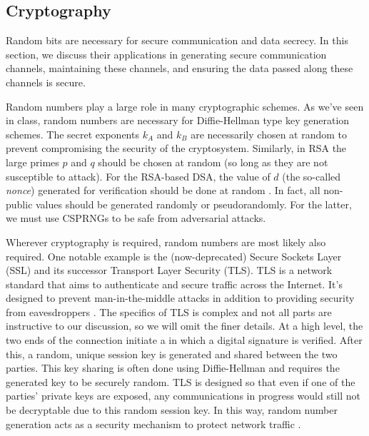\documentclass[titlepage]{article}
\theoremstyle{definition}
\begin{document}
\subsection{Cryptography}
Random bits are necessary for secure communication and data secrecy. In this section, we discuss their applications in generating secure communication channels, maintaining these channels, and ensuring the data passed along these channels is secure.

Random numbers play a large role in many cryptographic schemes. As we've seen in class, random numbers are necessary for Diffie-Hellman type key generation schemes. The secret exponents $k_A$ and $k_B$ are necessarily chosen at random to prevent compromising the security of the cryptosystem. Similarly, in RSA the large primes $p$ and $q$ should be chosen at random (so long as they are not susceptible to attack). For the RSA-based DSA, the value of $d$ (the so-called \textit{nonce}) generated for verification should be done at random \cite{Textbook}. In fact, all non-public values should be generated randomly or pseudorandomly. For the latter, we must use CSPRNGs to be safe from adversarial attacks.

Wherever cryptography is required, random numbers are most likely also required. One notable example is the (now-deprecated) Secure Sockets Layer (SSL) and its successor Transport Layer Security (TLS). TLS is a network standard that aims to authenticate and secure traffic across the Internet. It's designed to prevent man-in-the-middle attacks in addition to providing security from eavesdroppers \cite{TLS}. The specifics of TLS is complex and not all parts are instructive to our discussion, so we will omit the finer details. At a high level, the two ends of the connection initiate a  in which a digital signature is verified. After this, a random, unique session key is generated and shared between the two parties. This key sharing is often done using Diffie-Hellman and requires the generated key to be securely random. TLS is designed so that even if one of the parties' private keys are exposed, any communications in progress would still not be decryptable due to this random session key. In this way, random number generation acts as a security mechanism to protect network traffic \cite{TLS}.
\end{document}
